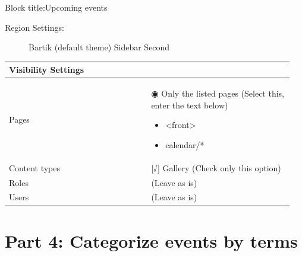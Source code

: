 \documentclass[letterpaper,10pt,english]{sphinxmanual}
\begin{document}
Block title:Upcoming events
\begin{description}
\item[{Region Settings:}] \leavevmode
Bartik (default theme)
Sidebar Second

\end{description}

\begin{tabular}{|p{0.475\linewidth}|p{0.475\linewidth}|}
\hline
 \multicolumn{2}{|l|}{\textbf{
Visibility Settings
}}\\\hline

Pages
 & 
◉ Only the listed pages (Select this, enter the text below)
\begin{itemize}
\item {} 
\textless{}front\textgreater{}

\item {} 
calendar/*

\end{itemize}
\\\hline

Content types
 & 
{[}√{]} Gallery (Check only this option)
\\\hline

Roles
 & 
(Leave as is)
\\\hline

Users
 & 
(Leave as is)
\\\hline
\end{tabular}



\section{Part 4: Categorize events by terms}
\label{event_calendar:part-4-categorize-events-by-terms}
\end{document}
